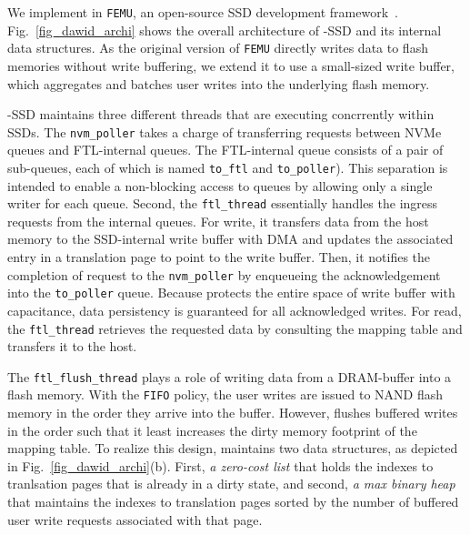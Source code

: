 %
%
%



We implement \ours{} in \texttt{FEMU}, an open-source SSD development
framework~\cite{li2018case}. Fig.~\ref{fig_dawid_archi} shows the overall
architecture of \ours{}-SSD and its internal data structures. As the original
version of \texttt{FEMU} directly writes data to flash memories without write
buffering, we extend it to use a small-sized write buffer, which aggregates and  
batches user writes into the underlying flash memory.  

\ours{}-SSD maintains three different threads that are executing concrrently
within SSDs.  The \texttt{nvm\_poller} takes a charge of transferring requests
between NVMe queues and FTL-internal queues. The FTL-internal queue consists of
a pair of sub-queues, each of which is named \texttt{to\_ftl} and
\texttt{to\_poller}). This separation is intended to enable a non-blocking
access to queues by allowing only a single writer for each queue.  Second, the
\texttt{ftl\_thread} essentially handles the ingress requests from the internal
queues. For write, it transfers data from the host memory to the SSD-internal
write buffer with DMA and updates the associated entry in a translation page to
point to the write buffer. Then, it notifies the completion of request to the
\texttt{nvm\_poller} by enqueueing the acknowledgement into the
\texttt{to\_poller} queue.  Because \ours{} protects the entire space of write
buffer with capacitance, data persistency is guaranteed for all acknowledged
writes.  For read, the \texttt{ftl\_thread} retrieves the requested data by
consulting the mapping table and transfers it to the host. 

The \texttt{ftl\_flush\_thread} plays a role of writing data from a DRAM-buffer
into a flash memory.  With the \texttt{FIFO} policy, the user writes are issued
to NAND flash memory in the order they arrive into the buffer. However, \ours{}
flushes buffered writes in the order such that it least increases the dirty memory
footprint of the mapping table.  To realize this design, \ours{} maintains two
data structures, as depicted in Fig.~\ref{fig_dawid_archi}(b). First, \textit{a
zero-cost list} that holds the indexes to tranlsation pages that is already
in a dirty state, and second, \textit{a max binary heap} that
maintains the indexes to translation pages sorted by the number of buffered
user write requests associated with that page.  

